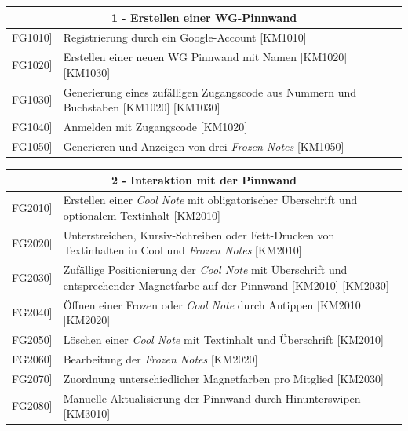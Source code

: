 \documentclass[a4paper]{scrreprt}
\begin{document}
    		\begin{table}[h!]
    			\centering
    			\label{my-label}
    			\begin{tabular}{p{2cm}p{12cm}}
    				
    				\multicolumn{2}{c}{\textbf{1 - Erstellen einer WG-Pinnwand}} \\ \hline
    				\centering{[}FG1010{]} & Registrierung durch ein Google-Account {[}KM1010{]}\\
    				\centering{[}FG1020{]}& Erstellen einer neuen WG Pinnwand mit Namen {[}KM1020{]} {[}KM1030{]}                                \\
    				\centering{[}FG1030{]}& Generierung eines zufälligen Zugangscode aus Nummern und Buchstaben {[}KM1020{]} {[}KM1030{]}\\ 
    				\centering{[}FG1040{]}& Anmelden mit Zugangscode {[}KM1020{]}\\ 
    				\centering{[}FG1050{]}& Generieren und Anzeigen von drei \textit{Frozen Notes} {[}KM1050{]}\\ 
    				\hline
    			\end{tabular}
    		\end{table}
    		
    		\vspace{5mm}
    		
    		\begin{table}[h!]
    			\centering
    			\label{my-label}
    			\begin{tabular}{p{2cm}p{12cm}}
    				
    				\multicolumn{2}{c}{\textbf{2 - Interaktion mit der Pinnwand}} \\ \hline
    				\centering{[}FG2010{]} & Erstellen einer \textit{Cool Note} mit obligatorischer Überschrift und optionalem Textinhalt {[}KM2010{]}\\
    				\centering{[}FG2020{]}& Unterstreichen, Kursiv-Schreiben oder Fett-Drucken von Textinhalten in Cool und \textit{Frozen Notes} {[}KM2010{]}                              \\
    				\centering{[}FG2030{]}& Zufällige Positionierung der \textit{Cool Note} mit Überschrift und entsprechender Magnetfarbe auf der Pinnwand {[}KM2010{]} {[}KM2030{]}\\ 
    				\centering{[}FG2040{]}& Öffnen einer Frozen oder \textit{Cool Note} durch Antippen {[}KM2010{]} {[}KM2020{]}\\ 
    				\centering{[}FG2050{]}& Löschen einer \textit{Cool Note} mit Textinhalt und Überschrift {[}KM2010{]}\\ 
    				\centering{[}FG2060{]}& Bearbeitung der \textit{Frozen Notes} {[}KM2020{]}\\ 
    				\centering{[}FG2070{]}& Zuordnung unterschiedlicher Magnetfarben pro Mitglied {[}KM2030{]}\\ 
    				\centering{[}FG2080{]}& Manuelle Aktualisierung der Pinnwand durch Hinunterswipen {[}KM3010{]}\\ 
    				\hline
    			\end{tabular}
    		\end{table}
    		
\end{document}
